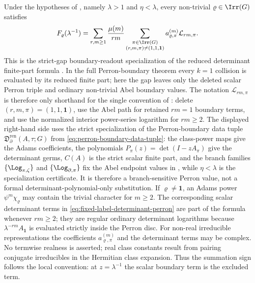 \begin{proposition}
  \label{prop:fixed-label-determinant-perron}
  Under the hypotheses of , namely
  \(\lambda>1\) and \(\eta<\lambda\), every
  non-trivial \(\varrho\in\Irr(G)\) satisfies
  \begin{equation}\label{eq:fixed-label-determinant-perron}
    F_\varrho(\lambda^{-1})
    =
    \sum_{r,m\ge1}\frac{\mu(m)}{rm}
      \sum_{\substack{\pi\in\Irr(G)\\(r,m,\pi)\neq(1,1,\mathbf1)}}
        a_{\varrho,\pi}^{(m)}
        \mathcal L_{rm,\pi}.
  \end{equation}
  This is the strict-gap boundary-readout specialization of the reduced
  determinant finite-part formula
  .
  In the full Perron-boundary theorem every \(k=1\) collision is evaluated by
  its reduced finite part; here the gap leaves only the deleted scalar Perron
  triple and ordinary non-trivial Abel boundary values.
  The notation \(\mathcal L_{rm,\pi}\) is therefore only shorthand for the
  single convention of : delete
  \((r,m,\pi)=(1,1,\mathbf1)\), use the Abel path for retained \(rm=1\)
  boundary terms, and use the normalized interior power-series logarithm for
  \(rm\ge2\).
  The displayed right-hand side uses the strict specialization of the
  Perron-boundary data tuple
  \(\mathfrak D_{\partial}^{\mathrm{ren}}(A,\tau;G)\) from
  \eqref{eq:perron-boundary-data-tuple}: the class-power maps give the Adams
  coefficients, the polynomials \(P_\pi(z)=\det(I-zA_\pi)\) give the determinant
  germs, \(C(A)\) is the strict scalar finite part, and
  the branch families \(\{\Log_{\pi,\zeta}\}\) and
  \(\{\Log_{\partial,\pi}\}\) fix the Abel endpoint values in
  , while \(\eta<\lambda\) is the
  specialization certificate.  It is therefore a branch-sensitive Perron value, not a
  formal determinant-polynomial-only substitution.
  If \(\varrho\neq\mathbf1\), an Adams power \(\psi^m\chi_\varrho\) may
  contain the trivial character for \(m\ge2\).  The corresponding scalar
  determinant terms in \eqref{eq:fixed-label-determinant-perron} are part
  of the formula whenever \(rm\ge2\); they are regular ordinary
  determinant logarithms because \(\lambda^{-rm}A_{\mathbf1}\) is evaluated
  strictly inside the Perron disc.
  For non-real irreducible representations the coefficients
  \(a_{\varrho,\pi}^{(m)}\) and the determinant terms may be complex.  No
  termwise realness is asserted; real class constants result from pairing
  conjugate irreducibles in the Hermitian class expansion.
  Thus the summation sign follows the local convention: at
  \(z=\lambda^{-1}\) the scalar boundary term is the excluded term.
\end{proposition}

